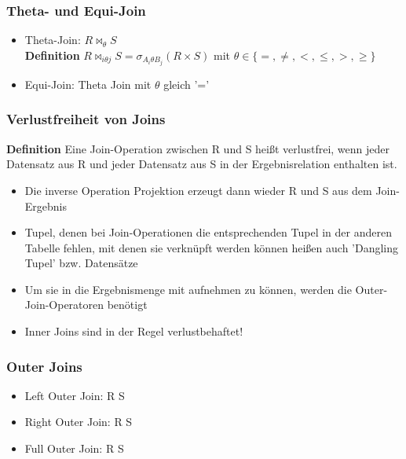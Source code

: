 \subsubsection{Theta- und Equi-Join}
\begin{itemize}
	\item Theta-Join: \(R \bowtie_\theta S\)\\
	\textbf{Definition} \(R\bowtie_{i\theta j}S = \sigma_{A_i\theta B_j}(R\times S)\) mit \(\theta \in \{=, \ne, <, \le, >, \ge \}\)
	\item Equi-Join: Theta Join mit \(\theta\) gleich '='
\end{itemize}
\subsubsection{Verlustfreiheit von Joins}
\textbf{Definition} Eine Join-Operation zwischen R und S heißt verlustfrei, wenn jeder Datensatz aus R und jeder Datensatz aus S in der Ergebnisrelation enthalten ist.
\begin{itemize}
	\item Die inverse Operation Projektion erzeugt dann wieder R und S aus dem Join-Ergebnis
	\item Tupel, denen bei Join-Operationen die entsprechenden Tupel in der anderen Tabelle fehlen, mit denen sie verknüpft werden können heißen auch 'Dangling Tupel' bzw. Datensätze
	\item Um sie in die Ergebnismenge mit aufnehmen zu können, werden die Outer-Join-Operatoren benötigt
	\item Inner Joins sind in der Regel verlustbehaftet!
\end{itemize}
\subsubsection{Outer Joins}
\begin{itemize}
	\item Left Outer Join: R {\tiny {}} S
	\item Right Outer Join: R {\tiny {}} S
	\item Full Outer Join: R {\tiny {}} S
\end{itemize}